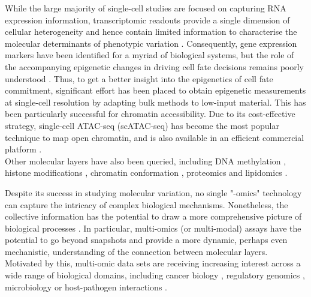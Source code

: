 While the large majority of single-cell studies are focused on capturing RNA expression information, transcriptomic readouts provide a single dimension of cellular heterogeneity and hence contain limited information to characterise the molecular determinants of phenotypic variation \cite{Ritchie2015}. Consequently, gene expression markers have been identified for a myriad of biological systems, but the role of the accompanying epigenetic changes in driving cell fate decisions remains poorly understood \cite{Griffiths2018,Kelsey2017,Bheda2014}. Thus, to get a better insight into the epigenetics of cell fate commitment, significant effort has been placed to obtain epigenetic measurements at single-cell resolution by adapting bulk methods to low-input material. This has been particularly successful for chromatin accessibility. Due to its cost-effective strategy, single-cell ATAC-seq (scATAC-seq) has become the most popular technique to map open chromatin, and is also available in an efficient commercial platform \cite{Cusanovich2015,Cao2018,Chen2018}.\\
Other molecular layers have also been queried, including DNA methylation \cite{Smallwood2014}, histone modifications \cite{Ku2019}, chromatin conformation \cite{Ku2019}, proteomics \cite{Specht2018} and lipidomics \cite{Thiele2019}.

Despite its success in studying molecular variation, no single "-omics" technology can capture the intricacy of complex biological mechanisms. Nonetheless, the collective information has the potential to draw a more comprehensive picture of biological processes \cite{Hasin2017,Ritchie2015}. In particular, multi-omics (or multi-modal) assays have the potential to go beyond snapshots and provide a more dynamic, perhaps even mechanistic, understanding of the connection between molecular layers. Motivated by this, multi-omic data sets are receiving increasing interest across a wide range of biological domains, including cancer biology \cite{Akavia2010,Gerstung2015}, regulatory genomics \cite{Chen2016}, microbiology \cite{Kim2016} or host-pathogen interactions \cite{Soderholm2016}. 

